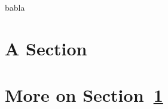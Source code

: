 \documentclass{article}
\begin{document}
\tableofcontents
\listoftodos


babla

\section{A Section}
\label{sec:one}

\todo[inline]{\ref{somelabel}}

\section{More on Section~\ref{sec:one}}
\end{document}
